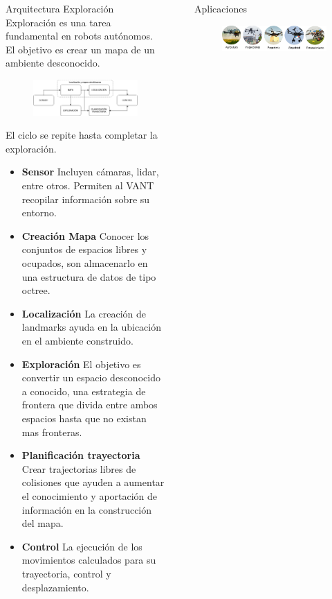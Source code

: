 \documentclass[final]{beamer}
\newlength{\sepwidth}
\newlength{\colwidth}
\newcommand{\separatorcolumn}{\begin{column}{\sepwidth}\end{column}}
\begin{document}
\begin{frame}[t]
\begin{columns}[t]
\begin{column}{\colwidth}
  \begin{block}{\color{teal}Arquitectura Exploración}
    Exploración es una tarea fundamental en robots autónomos. El objetivo es crear un mapa de un ambiente desconocido.
    \begin{figure}[t]
      \centering
      \includegraphics[width=30cm]{images/exploracion.png}
    \end{figure}
    El ciclo se repite hasta completar la exploración.
    \begin{itemize}
    \item \textbf{Sensor} Incluyen cámaras, lidar, entre otros. Permiten al VANT recopilar información sobre su entorno.
    \item \textbf{Creación Mapa} Conocer los conjuntos de espacios libres y ocupados, son almacenarlo en una estructura de datos de tipo octree.
    \item \textbf{Localización} La creación de landmarks ayuda en la ubicación en el ambiente construido.
    \item \textbf{Exploración} El objetivo es convertir un espacio desconocido a conocido, una estrategia de frontera que divida entre ambos espacios hasta que no existan mas fronteras.
    \item \textbf{Planificación trayectoria} Crear trajectorias libres de colisiones que ayuden a aumentar el conocimiento y aportación de información en la construcción del mapa.
    \item \textbf{Control} La ejecución de los movimientos calculados para su trayectoria, control y desplazamiento.
    \end{itemize}
  \end{block}
\end{column}

\separatorcolumn

\begin{column}{\colwidth}
  
  \begin{block}{\color{teal}Aplicaciones}

    \begin{figure}
      \centering
      \includegraphics[width=30cm]{images/ap_dr.png}
      \end{figure}
  \end{block}


\end{column}
\end{columns}
\end{frame}
\end{document}
